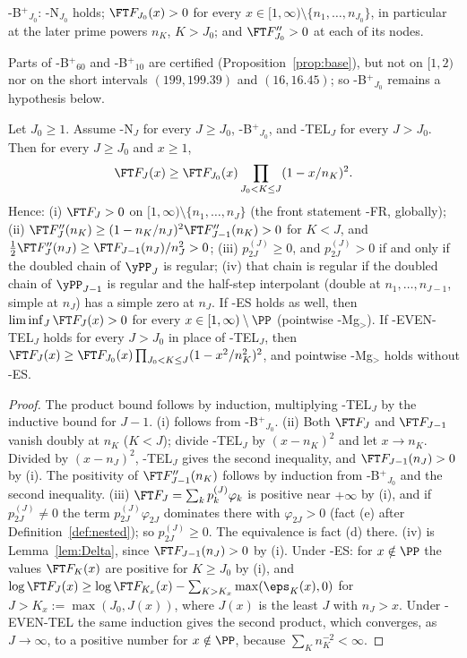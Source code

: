 \begin{hypothesis}[Base]\label{hyp:Bplus}
\hyp{B$^+$}$_{J_0}$: \hyp{N}$_{J_0}$ holds; $\FT F_{J_0}(x)>0$ for every $x\in[1,\infty)\setminus\{n_1,\dots,n_{J_0}\}$, in
particular at the later prime powers $n_K$, $K>J_0$; and $\FT F_{J_0}''>0$ at each of its nodes.
\end{hypothesis}

Parts of \hyp{B$^+$}$_{60}$ and \hyp{B$^+$}$_{10}$ are certified (Proposition~\ref{prop:base}), but not on $[1,2)$ nor on
the short intervals $(199,199.39)$ and $(16,16.45)$; so \hyp{B$^+$}$_{J_0}$ remains a hypothesis below.

\begin{theorem}\label{thm:B}
Let $J_0\ge1$. Assume \hyp{N}$_J$ for every $J\ge J_0$, \hyp{B$^+$}$_{J_0}$, and \hyp{TEL$_J$} for every $J>J_0$. Then for every
$J\ge J_0$ and $x\ge1$,
\[
\FT F_J(x)\ge\FT F_{J_0}(x)\prod_{J_0<K\le J}(1-x/n_K)^2.
\]
Hence:
(i) $\FT F_J>0$ on $[1,\infty)\setminus\{n_1,\dots,n_J\}$ (the front statement \hyp{FR}, globally);
(ii) $\FT F_J''(n_K)\ge(1-n_K/n_J)^2\FT F_{J-1}''(n_K)>0$ for $K<J$, and $\frac12\FT F_J''(n_J)\ge\FT F_{J-1}(n_J)/n_J^2>0$;
(iii) $p^{(J)}_{2J}\ge0$, and $p^{(J)}_{2J}>0$ if and only if the doubled chain of $\yPP_J$ is regular;
(iv) that chain is regular if the doubled chain of $\yPP_{J-1}$ is regular and the half-step interpolant (double at
$n_1,\dots,n_{J-1}$, simple at $n_J$) has a simple zero at $n_J$.
If \hyp{ES} holds as well, then $\liminf_J\FT F_J(x)>0$ for every $x\in[1,\infty)\setminus\PP$ (pointwise \hyp{Mg$_>$}). If
\hyp{EVEN-TEL$_J$} holds for every $J>J_0$ in place of \hyp{TEL$_J$}, then
$\FT F_J(x)\ge\FT F_{J_0}(x)\prod_{J_0<K\le J}(1-x^2/n_K^2)^2$, and pointwise \hyp{Mg$_>$} holds without \hyp{ES}.
\end{theorem}

\begin{proof}
The product bound follows by induction, multiplying \hyp{TEL$_J$} by the inductive bound for $J-1$. (i) follows from
\hyp{B$^+$}$_{J_0}$. (ii) Both $\FT F_J$ and $\FT F_{J-1}$ vanish doubly at $n_K$ ($K<J$); divide \hyp{TEL$_J$} by $(x-n_K)^2$ and
let $x\to n_K$. Divided by $(x-n_J)^2$, \hyp{TEL$_J$} gives the second inequality, and $\FT F_{J-1}(n_J)>0$ by (i). The
positivity of $\FT F_{J-1}''(n_K)$ follows by induction from \hyp{B$^+$}$_{J_0}$ and the second inequality.
(iii) $\FT F_J=\sum_kp^{(J)}_k\varphi_k$ is positive near $+\infty$ by (i), and if $p^{(J)}_{2J}\ne0$ the term
$p^{(J)}_{2J}\varphi_{2J}$ dominates there with $\varphi_{2J}>0$ (fact (e) after Definition~\ref{def:nested}); so
$p^{(J)}_{2J}\ge0$. The equivalence is fact (d) there. (iv) is Lemma~\ref{lem:Delta}, since $\FT F_{J-1}(n_J)>0$ by (i).
Under \hyp{ES}: for $x\notin\PP$ the values $\FT F_K(x)$ are positive for $K\ge J_0$ by (i), and
$\log\FT F_J(x)\ge\log\FT F_{K_x}(x)-\sum_{K>K_x}\max(\eps_K(x),0)$ for $J>K_x:=\max(J_0,J(x))$, where $J(x)$ is the least $J$
with $n_J>x$. Under \hyp{EVEN-TEL} the same induction gives the second product, which converges, as $J\to\infty$,
to a positive number for $x\notin\PP$, because $\sum_Kn_K^{-2}<\infty$.
\end{proof}

